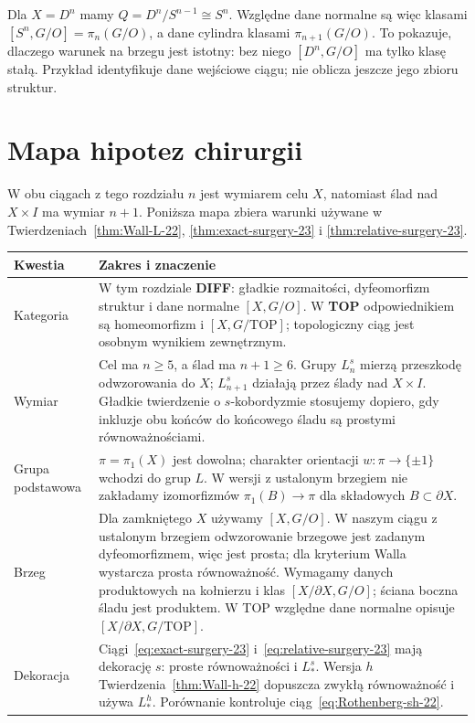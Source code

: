 \begin{przyklad}
Dla $X=D^n$ mamy $Q=D^n/S^{n-1}\cong S^n$.
Względne dane normalne są więc klasami
$[S^n,G/O]=\pi_n(G/O)$, a dane cylindra
klasami $\pi_{n+1}(G/O)$.
To pokazuje, dlaczego warunek na brzegu
jest istotny: bez niego $[D^n,G/O]$
ma tylko klasę stałą.
Przykład identyfikuje dane wejściowe ciągu;
nie oblicza jeszcze jego zbioru struktur.
\end{przyklad}

\section{Mapa hipotez chirurgii}
\label{sec:mapa-hipotez-chirurgii-23}

W obu ciągach z tego rozdziału $n$ jest
wymiarem celu $X$, natomiast ślad nad
$X\times I$ ma wymiar $n+1$.
Poniższa mapa zbiera warunki używane
w Twierdzeniach~\ref{thm:Wall-L-22},
\ref{thm:exact-surgery-23} i
\ref{thm:relative-surgery-23}.

\begin{center}
\small
\renewcommand{\arraystretch}{1.18}
\begin{tabular}{@{}p{.19\linewidth}p{.74\linewidth}@{}}
\hline
\textbf{Kwestia} & \textbf{Zakres i znaczenie} \\
\hline
Kategoria
& W tym rozdziale \textbf{DIFF}: gładkie rozmaitości,
  dyfeomorfizm struktur i dane normalne $[X,G/O]$.
  W \textbf{TOP} odpowiednikiem są homeomorfizm
  i $[X,G/\mathrm{TOP}]$; topologiczny ciąg jest
  osobnym wynikiem zewnętrznym. \\
Wymiar
& Cel ma $n\geq5$, a ślad ma $n+1\geq6$.
  Grupy $L_n^s$ mierzą przeszkodę odwzorowania do $X$;
  $L_{n+1}^s$ działają przez ślady nad $X\times I$.
  Gładkie twierdzenie o $s$-kobordyzmie
  stosujemy dopiero, gdy inkluzje obu końców
  do końcowego śladu są prostymi równoważnościami. \\
Grupa podstawowa
& $\pi=\pi_1(X)$ jest dowolna; charakter orientacji
  $w:\pi\to\{\pm1\}$ wchodzi do grup $L$.
  W wersji z ustalonym brzegiem nie zakładamy
  izomorfizmów $\pi_1(B)\to\pi$ dla składowych
  $B\subset\partial X$. \\
Brzeg
& Dla zamkniętego $X$ używamy $[X,G/O]$.
  W naszym ciągu z ustalonym brzegiem odwzorowanie
  brzegowe jest zadanym dyfeomorfizmem, więc
  jest prosta; dla kryterium Walla wystarcza
  prosta równoważność. Wymagamy danych
  produktowych na kołnierzu i klas
  $[X/\partial X,G/O]$; ściana boczna
  śladu jest produktem. W TOP względne dane
  normalne opisuje $[X/\partial X,G/\mathrm{TOP}]$. \\
Dekoracja
& Ciągi~\eqref{eq:exact-surgery-23}
  i~\eqref{eq:relative-surgery-23} mają dekorację
  $s$: proste równoważności i $L_*^s$.
  Wersja $h$ Twierdzenia~\ref{thm:Wall-h-22}
  dopuszcza zwykłą równoważność i używa $L_*^h$.
  Porównanie kontroluje
  ciąg~\eqref{eq:Rothenberg-sh-22}. \\
\hline
\end{tabular}
\end{center}

